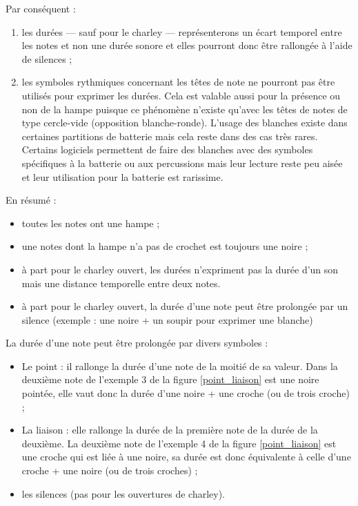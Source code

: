 Par conséquent :
\begin{enumerate}
    \item les durées — sauf pour le charley — représenterons un écart temporel
        entre les notes et non une durée sonore et elles pourront donc être
        rallongée à l’aide de silences ;
    \item les symboles rythmiques concernant les têtes de note ne pourront pas
        être utilisés pour exprimer les durées. Cela est valable aussi pour la
        présence ou non de la hampe puisque ce phénomène n’existe qu’avec les
        têtes de notes de type cercle-vide (opposition blanche-ronde). L’usage
        des blanches existe dans certaines partitions de batterie
        \cite{system_drums} mais cela reste dans des cas très rares. Certains
        logiciels permettent de faire des blanches avec des symboles
        spécifiques à la batterie ou aux percussions mais leur lecture reste
        peu aisée et leur utilisation pour la batterie est rarissime.\\
\end{enumerate}

En résumé :
\begin{itemize}
    \item toutes les notes ont une hampe ;
    \item une notes dont la hampe n’a pas de crochet est toujours une noire ;
    \item à part pour le charley ouvert, les durées n’expriment pas la durée
        d’un son mais une distance temporelle entre deux notes.
    \item à part pour le charley ouvert, la durée d’une note peut être
        prolongée par un silence (exemple : une noire + un soupir pour exprimer
        une blanche)\\
\end{itemize}
La durée d’une note peut être prolongée par divers symboles :
\begin{itemize}
	\item Le point : il rallonge la durée d’une note de la moitié de sa valeur.
        Dans la deuxième note de l’exemple 3 de la figure \ref{point_liaison}
        est une noire pointée, elle vaut donc la durée d’une noire + une croche
        (ou de trois croche) ;
	\item La liaison : elle rallonge la durée de la première note de la durée
        de la deuxième. La deuxième note de l’exemple 4 de la figure
        \ref{point_liaison} est une croche qui est liée à une noire, sa durée
        est donc équivalente à celle d’une croche + une noire (ou de trois
        croches) ;
    \item les silences (pas pour les ouvertures de charley).
\end{itemize}

